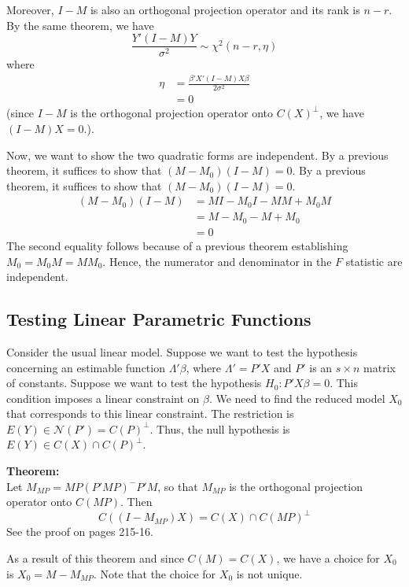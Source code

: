 \documentclass[12pt]{article}
\numberwithin{equation}{section}
\begin{document}
Moreover, $I - M$ is also an orthogonal projection operator and its rank is $n - r$. By the same theorem, we have
\begin{equation*}
  \frac{Y'(I - M)Y}{\sigma^2} \sim \chi^2(n - r, \eta)
\end{equation*}
where 
\begin{align*}
  \eta &= \frac{\beta' X' (I - M) X \beta}{2\sigma^2} \\
    &= 0
\end{align*}
(since $I - M$ is the orthogonal projection operator onto $C(X)^\perp$, we have $(I - M)X = 0$.).

Now, we want to show the two quadratic forms are independent. By a previous theorem, it suffices to show that $(M - M_0)(I - M) = 0$. By a previous theorem, it suffices to show that $(M - M_0)(I - M) = 0$.
%
\begin{align*}
  (M - M_0)(I - M) &= MI - M_0 I - MM + M_0M \\
    &= M - M_0 - M + M_0 \\
    &= 0
\end{align*}
The second equality follows because of a previous theorem establishing $M_0 = M_0M = MM_0$. Hence, the numerator and denominator in the $F$ statistic are independent.

\subsection{Testing Linear Parametric Functions}
Consider the usual linear model. Suppose we want to test the hypothesis concerning an estimable function $\Lambda ' \beta$, where $\Lambda' = P'X$ and $P'$ is an $s \times n$ matrix of constants. Suppose we want to test the hypothesis $H_0: P'X\beta = 0$. This condition imposes a linear constraint on $\beta$. We need to find the reduced model $X_0$ that corresponds to this linear constraint. The restriction is $E(Y) \in \mathcal{N}(P') = C(P)^{\perp}$. Thus, the null hypothesis is $E(Y) \in C(X) \cap C(P)^{\perp}$.

\textbf{Theorem:} \\
Let $M_{MP} = MP(P'MP)^{-}P'M$, so that $M_{MP}$ is the orthogonal projection operator onto $C(MP)$. Then
\begin{equation*}
  C((I - M_{MP})X) = C(X) \cap C(MP)^{\perp}
\end{equation*}
See the proof on pages 215-16.

As a result of this theorem and since $C(M) = C(X)$, we have a choice for $X_0$ is $X_0 = M - M_{MP}$. Note that the choice for $X_0$ is not unique.
\end{document}
